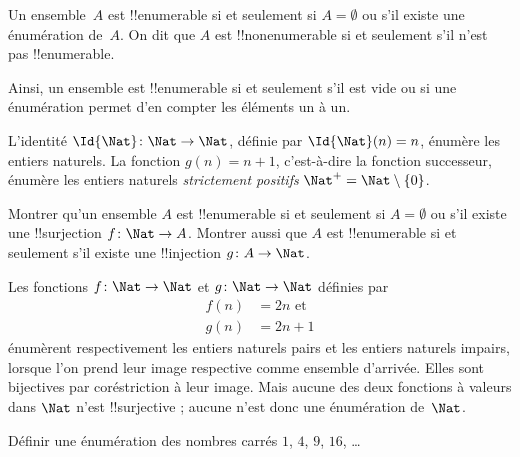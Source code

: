 \documentclass[../../../include/open-logic-section]{subfiles}
\begin{document}
\begin{defn}
  Un ensemble~$A$ est !!{enumerable} si et seulement si
  $A = \emptyset$ ou s'il existe une énumération de~$A$.
  On dit que $A$ est !!{nonenumerable} si et seulement s'il
  n'est pas !!{enumerable}.
\end{defn}

\begin{explain}
Ainsi, un ensemble est !!{enumerable} si et seulement s'il est
vide ou si une énumération permet d'en compter les éléments un à un.
\end{explain}

\begin{ex}
L'identité $\Id{\Nat} \colon \Nat \to \Nat$, définie par
$\Id{\Nat}(n) = n$, énumère les entiers naturels. La fonction
$g(n) = n + 1$, c'est-à-dire la fonction successeur, énumère les
entiers naturels \emph{strictement positifs}
$\Nat^+ = \Nat \setminus \{0\}$.
\end{ex}

\begin{prob}
Montrer qu'un ensemble $A$ est !!{enumerable} si et seulement si
$A = \emptyset$ ou s'il existe une !!{surjection}
$f\colon \Nat \to A$. Montrer aussi que $A$ est !!{enumerable}
si et seulement s'il existe une !!{injection} $g\colon A \to \Nat$.
\end{prob}

\begin{ex}
Les fonctions $f\colon \Nat \to \Nat$ et $g \colon \Nat \to \Nat$
définies par
\begin{align*}
  f(n) & = 2n \text{ et}\\
  g(n) & = 2n+1
\end{align*}
énumèrent respectivement les entiers naturels pairs et les entiers
naturels impairs, lorsque l'on prend leur image respective comme
ensemble d'arrivée. Elles sont bijectives par coréstriction à leur image.
%
%
%
%
Mais aucune des deux fonctions à valeurs dans $\Nat$ n'est
!!{surjective} ; aucune n'est donc une énumération de~$\Nat$.
\end{ex}

\begin{prob}
Définir une énumération des nombres carrés $1$, $4$, $9$, $16$, \dots
\end{prob}
\end{document}
